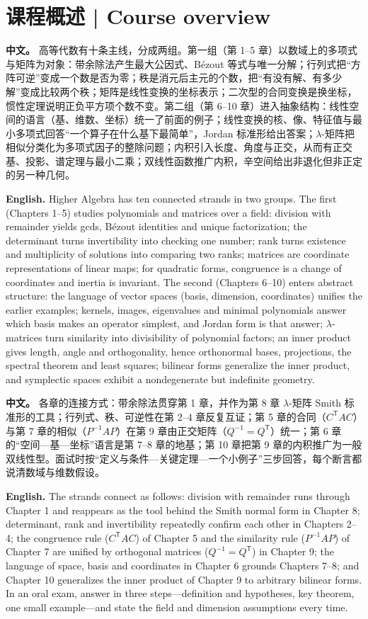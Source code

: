 \documentclass[UTF8,11pt,a4paper]{ctexart}
\newcommand{\APS}[2]{\par\noindent\textbf{中文。} #1\par\noindent\textbf{English.} #2\par\smallskip}
\begin{document}
\section*{课程概述 | Course overview}
\APS{高等代数有十条主线，分成两组。第一组（第 1--5 章）以数域上的多项式与矩阵为对象：带余除法产生最大公因式、Bézout 等式与唯一分解；行列式把“方阵可逆”变成一个数是否为零；秩是消元后主元的个数，把“有没有解、有多少解”变成比较两个秩；矩阵是线性变换的坐标表示；二次型的合同变换是换坐标，惯性定理说明正负平方项个数不变。第二组（第 6--10 章）进入抽象结构：线性空间的语言（基、维数、坐标）统一了前面的例子；线性变换的核、像、特征值与最小多项式回答“一个算子在什么基下最简单”，Jordan 标准形给出答案；$\lambda$-矩阵把相似分类化为多项式因子的整除问题；内积引入长度、角度与正交，从而有正交基、投影、谱定理与最小二乘；双线性函数推广内积，辛空间给出非退化但非正定的另一种几何。}{Higher Algebra has ten connected strands in two groups. The first (Chapters 1--5) studies polynomials and matrices over a field: division with remainder yields gcds, Bézout identities and unique factorization; the determinant turns invertibility into checking one number; rank turns existence and multiplicity of solutions into comparing two ranks; matrices are coordinate representations of linear maps; for quadratic forms, congruence is a change of coordinates and inertia is invariant. The second (Chapters 6--10) enters abstract structure: the language of vector spaces (basis, dimension, coordinates) unifies the earlier examples; kernels, images, eigenvalues and minimal polynomials answer which basis makes an operator simplest, and Jordan form is that answer; $\lambda$-matrices turn similarity into divisibility of polynomial factors; an inner product gives length, angle and orthogonality, hence orthonormal bases, projections, the spectral theorem and least squares; bilinear forms generalize the inner product, and symplectic spaces exhibit a nondegenerate but indefinite geometry.}
\APS{各章的连接方式：带余除法贯穿第 1 章，并作为第 8 章 $\lambda$-矩阵 Smith 标准形的工具；行列式、秩、可逆性在第 2--4 章反复互证；第 5 章的合同（$C^{\mathsf T}AC$）与第 7 章的相似（$P^{-1}AP$）在第 9 章由正交矩阵（$Q^{-1}=Q^{\mathsf T}$）统一；第 6 章的“空间—基—坐标”语言是第 7--8 章的地基；第 10 章把第 9 章的内积推广为一般双线性型。面试时按“定义与条件—关键定理—一个小例子”三步回答，每个断言都说清数域与维数假设。}{The strands connect as follows: division with remainder runs through Chapter 1 and reappears as the tool behind the Smith normal form in Chapter 8; determinant, rank and invertibility repeatedly confirm each other in Chapters 2--4; the congruence rule ($C^{\mathsf T}AC$) of Chapter 5 and the similarity rule ($P^{-1}AP$) of Chapter 7 are unified by orthogonal matrices ($Q^{-1}=Q^{\mathsf T}$) in Chapter 9; the language of space, basis and coordinates in Chapter 6 grounds Chapters 7--8; and Chapter 10 generalizes the inner product of Chapter 9 to arbitrary bilinear forms. In an oral exam, answer in three steps---definition and hypotheses, key theorem, one small example---and state the field and dimension assumptions every time.}
\end{document}
